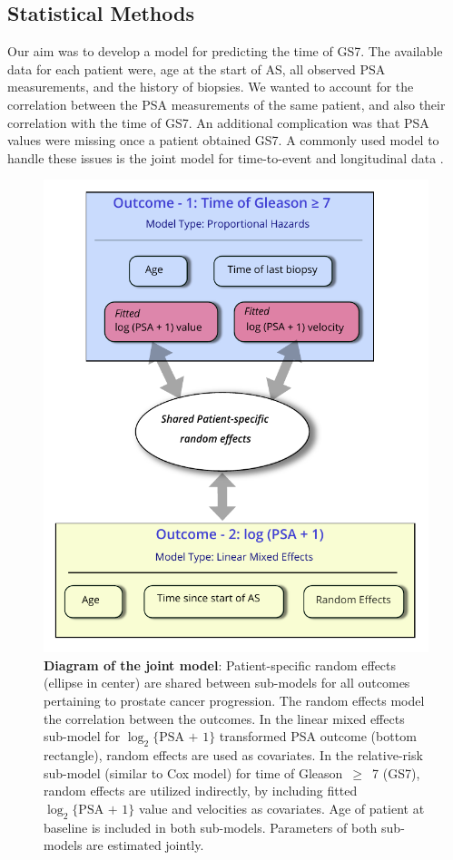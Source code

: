\subsection{Statistical Methods}
Our aim was to develop a model for predicting the time of GS7. The available data for each patient were, age at the start of AS, all observed PSA measurements, and the history of biopsies. We wanted to account for the correlation between the PSA measurements of the same patient, and also their correlation with the time of GS7. An additional complication was that PSA values were missing once a patient obtained GS7. A commonly used model to handle these issues is the joint model for time-to-event and longitudinal data \citep{rizopoulos2012joint,tomer2019,coley2017prediction}.

\begin{figure}[!htb]
\centerline{\includegraphics[width=\columnwidth]{images/jm_blockdiag.pdf}}
\caption{\textbf{Diagram of the joint model}: Patient-specific random effects (ellipse in center) are shared between sub-models for all outcomes pertaining to prostate cancer progression. The random effects model the correlation between the outcomes. In the linear mixed effects sub-model for $\log_2\{\mbox{PSA + 1}\}$ transformed PSA outcome (bottom rectangle), random effects are used as covariates. In the relative-risk sub-model (similar to Cox model) for time of Gleason~$\geq$~7 (GS7), random effects are utilized indirectly, by including fitted $\log_2\{\mbox{PSA + 1}\}$ value and velocities as covariates. Age of patient at baseline is included in both sub-models. Parameters of both sub-models are estimated jointly.}
\label{fig:jm_blockdiag}
\end{figure}

